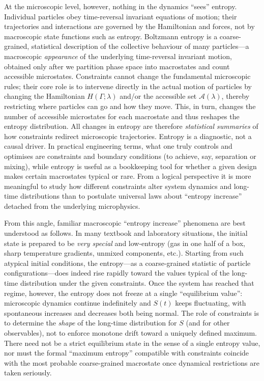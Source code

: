 \documentclass[11pt,a4paper]{article}
\begin{document}
At the microscopic level, however, nothing in the dynamics ``sees'' entropy.
Individual particles obey time-reversal invariant equations of motion; their
trajectories and interactions are governed by the Hamiltonian and forces, not by
macroscopic state functions such as entropy. Boltzmann entropy is a coarse-grained,
statistical description of the collective behaviour of many particles---a
macroscopic \emph{appearance} of the underlying time-reversal invariant motion,
obtained only after we partition phase space into macrostates and count accessible
microstates. Constraints cannot change the fundamental microscopic rules; their
core role is to intervene directly in the actual motion of particles by changing
the Hamiltonian $H(\Gamma;\lambda)$ and/or the accessible set
$\mathcal{A}(\lambda)$, thereby restricting where particles can go and how they
move. This, in turn, changes the number of accessible microstates for each
macrostate and thus reshapes the entropy distribution. All changes in entropy are
therefore \emph{statistical summaries} of how constraints redirect microscopic
trajectories. Entropy is a diagnostic, not a causal driver. In practical
engineering terms, what one truly controls and optimises are constraints and
boundary conditions (to achieve, say, separation or mixing), while entropy is
useful as a bookkeeping tool for whether a given design makes certain macrostates
typical or rare. From a logical perspective it is more meaningful to study how
different constraints alter system dynamics and long-time distributions than to
postulate universal laws about ``entropy increase'' detached from the underlying
microphysics.

From this angle, familiar macroscopic ``entropy increase'' phenomena are best
understood as follows. In many textbook and laboratory situations, the initial
state is prepared to be \emph{very special} and low-entropy (gas in one half of
a box, sharp temperature gradients, unmixed components, etc.). Starting from such
atypical initial conditions, the entropy---as a coarse-grained statistic of
particle configurations---does indeed rise rapidly toward the values typical of
the long-time distribution under the given constraints. Once the system has
reached that regime, however, the entropy does not freeze at a single ``equilibrium
value'': microscopic dynamics continue indefinitely and $S(t)$ keeps fluctuating,
with spontaneous increases and decreases both being normal. The role of constraints
is to determine the \emph{shape} of the long-time distribution for $S$ (and for
other observables), not to enforce monotone drift toward a uniquely defined maximum.
There need not be a strict equilibrium state in the sense of a single entropy
value, nor must the formal ``maximum entropy'' compatible with constraints coincide
with the most probable coarse-grained macrostate once dynamical restrictions are
taken seriously.
\end{document}
